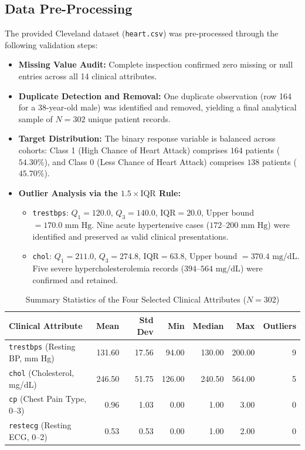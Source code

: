 \documentclass[12pt,a4paper]{article}
\begin{document}
\subsection{Data Pre-Processing}
The provided Cleveland dataset (\texttt{heart.csv}) was pre-processed through the following validation steps:
\begin{itemize}
    \item \textbf{Missing Value Audit:} Complete inspection confirmed zero missing or null entries across all 14 clinical attributes.
    \item \textbf{Duplicate Detection and Removal:} One duplicate observation (row 164 for a 38-year-old male) was identified and removed, yielding a final analytical sample of $N = 302$ unique patient records.
    \item \textbf{Target Distribution:} The binary response variable is balanced across cohorts: Class 1 (High Chance of Heart Attack) comprises $164$ patients ($54.30\%$), and Class 0 (Less Chance of Heart Attack) comprises $138$ patients ($45.70\%$).
    \item \textbf{Outlier Analysis via the $1.5 \times \text{IQR}$ Rule:}
    \begin{itemize}
        \item \texttt{trestbps}: $Q_1 = 120.0$, $Q_3 = 140.0$, $\text{IQR} = 20.0$, Upper bound $= 170.0\text{ mm Hg}$. Nine acute hypertensive cases ($172\text{--}200\text{ mm Hg}$) were identified and preserved as valid clinical presentations.
        \item \texttt{chol}: $Q_1 = 211.0$, $Q_3 = 274.8$, $\text{IQR} = 63.8$, Upper bound $= 370.4\text{ mg/dL}$. Five severe hypercholesterolemia records ($394\text{--}564\text{ mg/dL}$) were confirmed and retained.
    \end{itemize}
\end{itemize}

\begin{table}[H]
    \centering
    \caption{Summary Statistics of the Four Selected Clinical Attributes ($N = 302$)}
    \label{tab:summary_stats}
    \small
    \begin{tabularx}{\textwidth}{@{}l R R R R R R@{}}
        \toprule
        \textbf{Clinical Attribute} & \textbf{Mean} & \textbf{Std Dev} & \textbf{Min} & \textbf{Median} & \textbf{Max} & \textbf{Outliers} \\
        \midrule
        \texttt{trestbps} (Resting BP, mm Hg) & 131.60 & 17.56 & 94.00  & 130.00 & 200.00 & 9 \\
        \texttt{chol} (Cholesterol, mg/dL)    & 246.50 & 51.75 & 126.00 & 240.50 & 564.00 & 5 \\
        \texttt{cp} (Chest Pain Type, 0--3)   & 0.96   & 1.03  & 0.00   & 1.00   & 3.00   & 0 \\
        \texttt{restecg} (Resting ECG, 0--2)  & 0.53   & 0.53  & 0.00   & 1.00   & 2.00   & 0 \\
        \bottomrule
    \end{tabularx}
\end{table}
\end{document}
